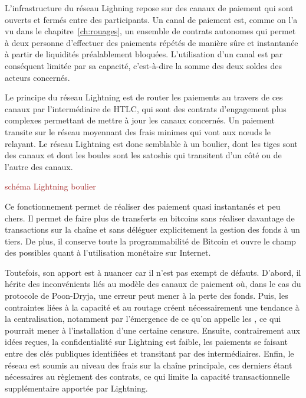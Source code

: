 L'infrastructure du réseau Lighning repose sur des canaux de paiement qui sont ouverts et fermés entre des participants. Un canal de paiement est, comme on l'a vu dans le chapitre~\ref{ch:rouages}, un ensemble de contrats autonomes qui permet à deux personne d'effectuer des paiements répétés de manière sûre et instantanée à partir de liquidités préalablement bloquées. L'utilisation d'un canal est par conséquent limitée par sa capacité, c'est-à-dire la somme des deux soldes des acteurs concernés.

Le principe du réseau Lightning est de router les paiements au travers de ces canaux par l'intermédiaire de HTLC, qui sont des contrats d'engagement plus complexes permettant de mettre à jour les canaux concernés. Un paiement transite sur le réseau moyennant des frais minimes qui vont aux nœuds le relayant. Le réseau Lightning est donc semblable à un boulier, dont les tiges sont des canaux et dont les boules sont les satoshis qui transitent d'un côté ou de l'autre des canaux.

\textcolor{brown}{schéma Lightning boulier}

Ce fonctionnement permet de réaliser des paiement quasi instantanés et peu chers. Il permet de faire plus de transferts en bitcoins sans réaliser davantage de transactions sur la chaîne et sans déléguer explicitement la gestion des fonds à un tiers. De plus, il conserve toute la programmabilité de Bitcoin et ouvre le champ des possibles quant à l'utilisation monétaire sur Internet.

Toutefois, son apport est à nuancer car il n'est pas exempt de défauts. D'abord, il hérite des inconvénients liés au modèle des canaux de paiement où, dans le cas du protocole de Poon-Dryja, une erreur peut mener à la perte des fonds. Puis, les contraintes liées à la capacité et au routage créent nécessairement une tendance à la centralisation, notamment par l'émergence de ce qu'on appelle les , ce qui pourrait mener à l'installation d'une certaine censure. Ensuite, contrairement aux idées reçues, la confidentialité sur Lightning est faible, les paiements se faisant entre des clés publiques identifiées et transitant par des intermédiaires. Enfin, le réseau est soumis au niveau des frais sur la chaîne principale, ces derniers étant nécessaires au règlement des contrats, ce qui limite la capacité transactionnelle supplémentaire apportée par Lightning.

